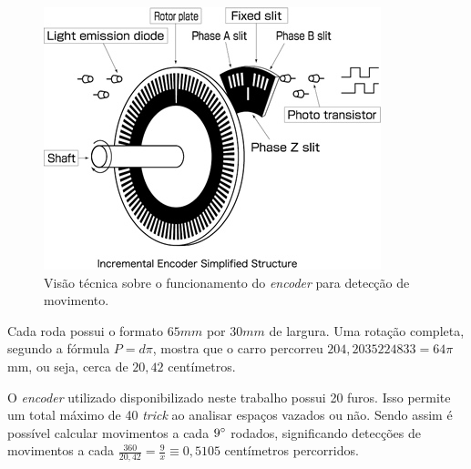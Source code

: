 \documentclass[portugues, brazil, a4paper,12pt]{article}
\begin{document}
				\begin{figure}[h]
					\centering
					\includegraphics[width=0.6\linewidth]{img/elementos-encoder.jpg}
					\caption{Visão técnica sobre o funcionamento do \textit{encoder} para detecção de movimento.}
					\label{fig:encoder}
				\end{figure}

				Cada roda possui o formato $ 65mm $ por $ 30mm $ de largura. Uma rotação completa, segundo a fórmula $ P = d \pi $, mostra que o carro percorreu $ 204,2035224833 = 64 \pi $ mm, ou seja, cerca de $ 20,42 $ centímetros.

				O \textit{encoder} utilizado disponibilizado neste trabalho possui 20 furos. Isso permite um total máximo de 40 \textit{trick} ao analisar espaços vazados ou não. Sendo assim é possível calcular movimentos a cada $9\degree$ rodados, significando detecções de movimentos a cada $\frac{360}{20,42} = \frac{9}{x} \equiv 0,5105$ centímetros percorridos.
\end{document}
